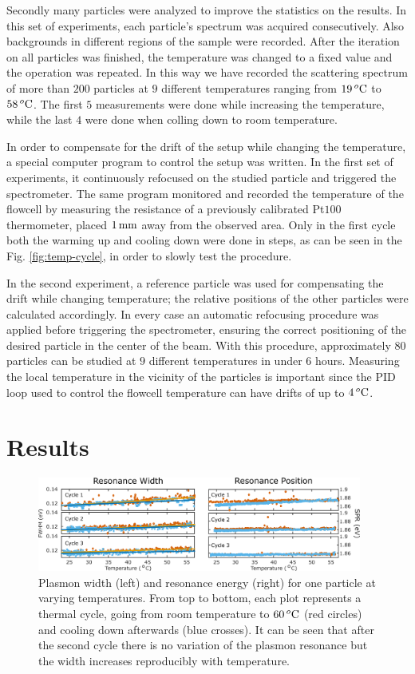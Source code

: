 Secondly many particles were analyzed to improve the statistics on the results.
In this set of experiments, each particle's spectrum was acquired consecutively.
Also backgrounds in different regions of the sample were recorded. After the
iteration on all particles was finished, the temperature was changed to a fixed
value and the operation was repeated. In this way we have recorded the
scattering spectrum of more than $200$ particles at $9$ different temperatures
ranging from $19\,^o\textrm{C}$ to $58\,^o\textrm{C}$. The first $5$ measurements were done
while increasing the temperature, while the last $4$ were done when colling down
to room temperature.

In order to compensate for the drift of the setup while changing the
temperature, a special computer program to control the setup was written. In the
first set of experiments, it continuously refocused on the studied particle and
triggered the spectrometer. The same program monitored and recorded the
temperature of the flowcell by measuring the resistance of a previously
calibrated Pt$100$ thermometer, placed $1\,\textrm{mm}$ away from the observed area. Only
in the first cycle both the warming up and cooling down were done in steps, as
can be seen in the Fig. \ref{fig:temp-cycle}, in order to slowly test the
procedure.

In the second experiment, a reference particle was used for compensating the
drift while changing temperature; the relative positions of the other particles
were calculated accordingly. In every case an automatic refocusing procedure was
applied before triggering the spectrometer, ensuring the correct positioning of
the desired particle in the center of the beam. With this procedure,
approximately $80$ particles can be studied at $9$ different temperatures in
under $6$ hours. Measuring the local temperature in the vicinity of the
particles is important since the PID loop used to control the flowcell
temperature can have drifts of up to $4\,^o\textrm{C}$.

\section{Results}
\begin{figure}[htp] \centering
\includegraphics[width=0.95\textwidth]{Chapters/05_WhiteLight/Figures/02_One_Pcle/02_One_Pcle.png}
\caption{Plasmon width (left) and resonance energy (right) for one particle at
varying temperatures. From top to bottom, each plot represents a thermal cycle,
going from room temperature to $60\,^o\textrm{C}$ (red circles) and cooling down
afterwards (blue crosses). It can be seen that after the second cycle there is
no variation of the plasmon resonance but the width increases reproducibly with
temperature.}
	\label{fig:one_pcle}
\end{figure}

